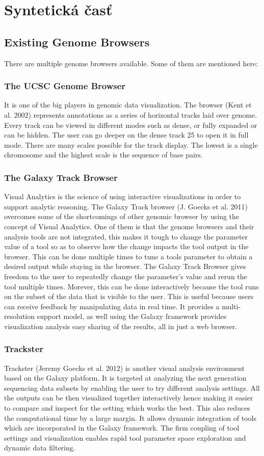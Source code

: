 
\chapter{Syntetická časť}
\section{Existing Genome Browsers}
There are multiple genome browsers available. Some of them are
mentioned here:
\subsection{The UCSC Genome Browser}
It is one of the big players in genomic data visualization. The browser (Kent
et al. 2002) represents annotations as a series of horizontal tracks laid over
genome. Every track can be viewed in different modes such as dense, or
fully expanded or can be hidden. The user can go deeper on the dense track
25
to open it in full mode. There are many scales possible for the track display.
The lowest is a single chromosome and the highest scale is the sequence of
base pairs.
\subsection{The Galaxy Track Browser}
Visual Analytics is the science of using interactive visualizations in order
to support analytic reasoning. The Galaxy Track browser (J. Goecks et al.
2011) overcomes some of the shortcomings of other genomic browser by
using the concept of Visual Analytics. One of them is that the genome
browsers and their analysis tools are not integrated, this makes it tough
to change the parameter value of a tool so as to observe how the change
impacts the tool output in the browser. This can be done multiple times
to tune a tools parameter to obtain a desired output while staying in the
browser.
The Galaxy Track Browser gives freedom to the user to repeatedly change
the parameter’s value and rerun the tool multiple times. Morever, this can
be done interactively because the tool runs on the subset of the data that is
visible to the user. This is useful because users can receive feedback by manipulating data in real time. It provides a multi-resolution support model,
as well using the Galaxy framework provides visualization analysis easy
sharing of the results, all in just a web browser.
\subsection{Trackster}
Trackster (Jeremy Goecks et al. 2012) is another visual analysis environment
based on the Galaxy platform. It is targeted at analyzing the next generation sequencing data subsets by enabling the user to try different analysis
settings. All the outputs can be then visualized together interactively hence
making it easier to compare and inspect for the setting which works the
best. This also reduces the computational time by a large margin. It allows
dynamic integration of tools which are incorporated in the Galaxy framework. The firm coupling of tool settings and visualization enables rapid
tool parameter space exploration and dynamic data filtering.

